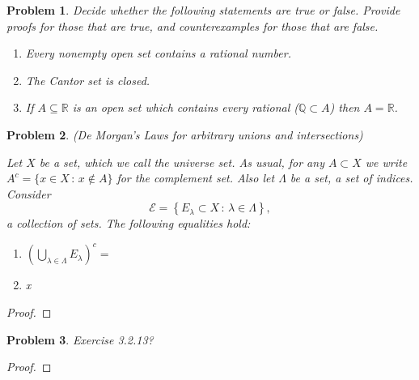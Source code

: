 \documentclass[12pt]{article}
\newtheorem{problem}{Problem}
\newcommand{\QQ}{\ensuremath{\mathbb Q}}
\newcommand{\RR}{\ensuremath{\mathbb R}}
\newcommand{\ds}{\displaystyle}
\begin{document}
\begin{problem} %
Decide whether the following statements are true or false.  Provide proofs for those that are true, and counterexamples for those that are false.

\renewcommand{\labelenumi}{\emph{(\alph{enumi})}}
\begin{enumerate}
\item Every nonempty open set contains a rational number.


\item The Cantor set is closed.


\item If $A\subseteq \RR$ is an open set which contains every rational ($\QQ \subset A$) then $A=\RR$.


\end{enumerate}
\end{problem}


\begin{problem} %
(De Morgan's Laws for arbitrary unions and intersections)

\medskip
\noindent Let $X$ be a set, which we call the universe set.  As usual, for any $A\subset X$ we write $A^c = \{x\in X\,:\,x \notin A\}$ for the complement set.  Also let $\Lambda$ be a set, a set of indices.  Consider
	$$\mathcal{E} = \left\{E_\lambda\subset X \,:\,\lambda \in \Lambda \right\},$$
a collection of sets.  The following equalities hold:
\renewcommand{\labelenumi}{\emph{(\roman{enumi})}}
\begin{enumerate}
\item $\ds \left(\bigcup_{\lambda\in\Lambda} E_\lambda\right)^c = $
\item x
\end{enumerate}
\end{problem}


\begin{proof}
\end{proof}


\begin{problem} %
Exercise 3.2.13?
\end{problem}


\begin{proof}
\end{proof}
\end{document}
